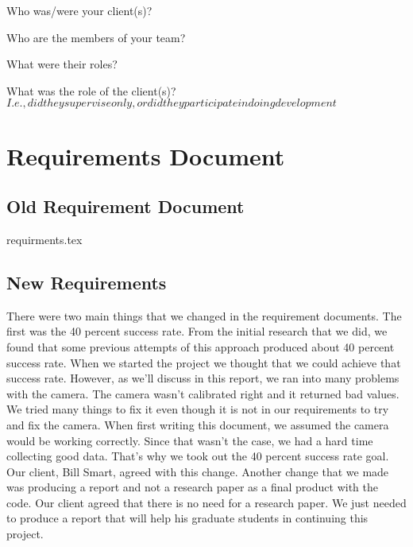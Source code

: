 \documentclass[onecolumn, draftclsnofoot,10pt, compsoc]{IEEEtran}
\begin{document}
	Who was/were your client(s)?
	
	Who are the members of your team?
	
	What were their roles?
	
	What was the role of the client(s)? \(I.e., did they supervise only, or did 
	they participate in doing development\)
	
	
	\section{Requirements Document}
	\subsection{Old Requirement Document}
	{requirments.tex}
	\subsection{New Requirements}
	There were two main things that we changed in the requirement documents. The first was the 40 percent success rate. From the initial research that we did, we found that some previous attempts of this approach produced about 40 percent success rate. When we started the project we thought that we could achieve that success rate. However, as we'll discuss in this report, we ran into many problems with the camera. The camera wasn't calibrated right and it returned bad values. We tried many things to fix it even though it is not in our requirements to try and fix the camera. When first writing this document, we assumed the camera would be working correctly. Since that wasn't the case, we had a hard time collecting good data. That's why we took out the 40 percent  success rate goal. Our client, Bill Smart, agreed with this change. Another change that we made was producing a report and not a research paper as a final product with the code. Our client agreed that there is no need for a research paper. We just needed to produce a report that will help his graduate students in continuing this project. 
\end{document}
